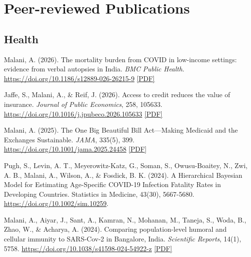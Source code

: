     \section*{Peer-reviewed Publications}

    \subsection*{Health}

    \begin{tablist}

        \item[2026] \tab{}Malani, A. (2026). The mortality burden from COVID in low-income settings: evidence from verbal autopsies in India. \textit{BMC Public Health}. \href{https://doi.org/10.1186/s12889-026-26215-9}{https://doi.org/10.1186/s12889-026-26215-9} \href{https://github.com/anup-malani/website_personal/blob/main/publications/2026_Malani_BMCPubHealth_COVIDMortalityIndia.pdf}{[PDF]}

        \item[2026] \tab{}Jaffe, S., Malani, A., \& Reif, J. (2026). Access to credit reduces the value of insurance. \textit{Journal of Public Economics}, 258, 105633. \href{https://doi.org/10.1016/j.jpubeco.2026.105633}{https://doi.org/10.1016/j.jpubeco.2026.105633} \href{https://github.com/anup-malani/website_personal/blob/main/publications/2026_JaffeMalaniReif_JPubEcon_AccessToCredit.pdf}{[PDF]}

        \item[2025] \tab{}Malani, A. (2025). The One Big Beautiful Bill Act---Making Medicaid and the Exchanges Sustainable. \textit{JAMA}, 335(5), 399. \href{https://doi.org/10.1001/jama.2025.24458}{https://doi.org/10.1001/jama.2025.24458} \href{https://github.com/anup-malani/website_personal/blob/main/publications/2025_Malani_JAMA_OBBBA_Medicaid.pdf}{[PDF]}

        \item[2024] \tab{}Pugh, S., Levin, A. T., Meyerowitz-Katz, G., Soman, S., Owusu-Boaitey, N., Zwi, A. B., Malani, A., Wilson, A., \& Fosdick, B. K. (2024). A Hierarchical Bayesian Model for Estimating Age-Specific COVID-19 Infection Fatality Rates in Developing Countries. Statistics in Medicine, 43(30), 5667-5680. \href{https://doi.org/10.1002/sim.10259}{https://doi.org/10.1002/sim.10259}.

        \item[2024] \tab{}Malani, A., Aiyar, J., Sant, A., Kamran, N., Mohanan, M., Taneja, S., Woda, B., Zhao, W., \& Acharya, A. (2024). Comparing population-level humoral and cellular immunity to SARS-Cov-2 in Bangalore, India. \textit{Scientific Reports}, 14(1), 5758. \href{https://doi.org/10.1038/s41598-024-54922-z}{https://doi.org/10.1038/s41598-024-54922-z} \href{https://github.com/anup-malani/website_personal/blob/main/publications/2024_MalaniEtAl_SciReports_CellullarImmunity.pdf}{[PDF]} 


\end{tablist}
